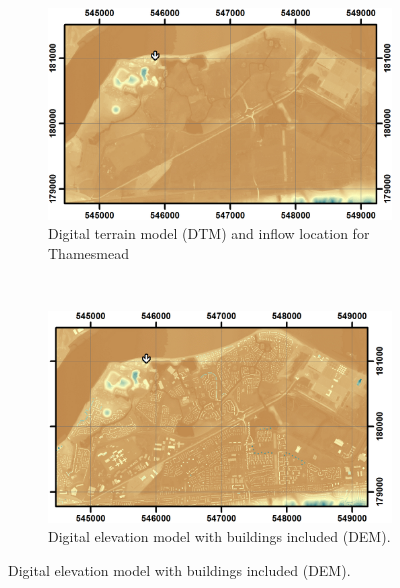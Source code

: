 \documentclass[11pt,english,a4paper]{article}
\begin{document}
\begin{figure}[tpb]
\centering
    \begin{subfigure}[t]{0.5\textwidth}
        \centering
        \includegraphics[width=1.0\textwidth]{Thamesmead_DTM.png}
        \caption{Digital terrain model (DTM) and inflow location for Thamesmead}
    \end{subfigure}%
    ~ 
    \begin{subfigure}[t]{0.5\textwidth}
        \centering
        \includegraphics[width=1.0\textwidth]{Thamesmead_DEM.png}
        \caption{Digital elevation model with buildings included (DEM).}
    \end{subfigure}


\end{figure}
\end{document}
